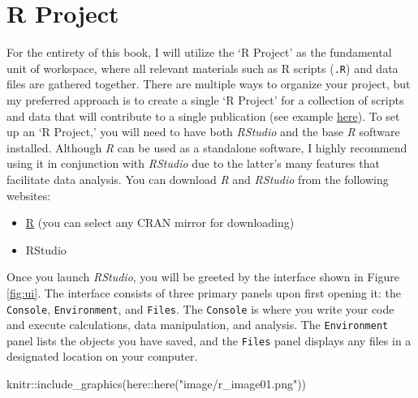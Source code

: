 \documentclass[
]{book}
\newenvironment{Shaded}{\begin{snugshade}}{\end{snugshade}}
\newcommand{\FunctionTok}[1]{\textcolor[rgb]{0.00,0.00,0.00}{#1}}
\newcommand{\NormalTok}[1]{#1}
\newcommand{\SpecialCharTok}[1]{\textcolor[rgb]{0.00,0.00,0.00}{#1}}
\newcommand{\StringTok}[1]{\textcolor[rgb]{0.31,0.60,0.02}{#1}}
\providecommand{\tightlist}{%
  \setlength{\itemsep}{0pt}\setlength{\parskip}{0pt}}
\begin{document}
\hypertarget{r-project}{%
\section{R Project}\label{r-project}}

For the entirety of this book, I will utilize the `R Project' as the fundamental unit of workspace, where all relevant materials such as R scripts (\texttt{.R}) and data files are gathered together. There are multiple ways to organize your project, but my preferred approach is to create a single `R Project' for a collection of scripts and data that will contribute to a single publication (see example \href{https://github.com/aterui/public-proj_stream-diversity}{here}). To set up an `R Project,' you will need to have both \emph{RStudio} and the base \emph{R} software installed. Although \emph{R} can be used as a standalone software, I highly recommend using it in conjunction with \emph{RStudio} due to the latter's many features that facilitate data analysis. You can download \emph{R} and \emph{RStudio} from the following websites:

\begin{itemize}
\tightlist
\item
  \href{https://www.r-project.org/}{R} (you can select any CRAN mirror for downloading)
\item
  RStudio
\end{itemize}

Once you launch \emph{RStudio}, you will be greeted by the interface shown in Figure \ref{fig:ui}. The interface consists of three primary panels upon first opening it: the \texttt{Console}, \texttt{Environment}, and \texttt{Files}. The \texttt{Console} is where you write your code and execute calculations, data manipulation, and analysis. The \texttt{Environment} panel lists the objects you have saved, and the \texttt{Files} panel displays any files in a designated location on your computer.

\begin{Shaded}
\begin{Highlighting}[]
\NormalTok{knitr}\SpecialCharTok{::}\FunctionTok{include\_graphics}\NormalTok{(here}\SpecialCharTok{::}\FunctionTok{here}\NormalTok{(}\StringTok{"image/r\_image01.png"}\NormalTok{))}
\end{Highlighting}
\end{Shaded}
\end{document}
